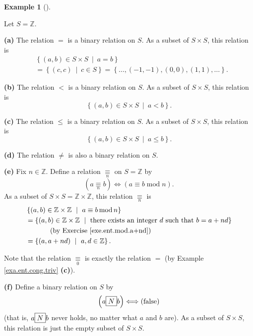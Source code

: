 \documentclass[numbers=enddot,12pt,final,onecolumn,notitlepage]{scrartcl}%
\numberwithin{exer}{subsection}
\theoremstyle{definition}
\newtheorem{exam}[theo]{Example}
\newenvironment{example}[1][]
{\begin{exam}[#1]\begin{leftbar}}
{\end{leftbar}\end{exam}}
\begin{document}
\begin{example}
\label{exa.eqrel.rel.rels1}Let $S=\mathbb{Z}$.

\textbf{(a)} The relation $=$ is a binary relation on $S$. As a subset of
$S\times S$, this relation is%
\begin{align*}
&  \left\{  \left(  a,b\right)  \in S\times S\ \mid\ a=b\right\}  \\
&  =\left\{  \left(  c,c\right)  \ \mid\ c\in S\right\}  =\left\{
\ldots,\left(  -1,-1\right)  ,\left(  0,0\right)  ,\left(  1,1\right)
,\ldots\right\}  .
\end{align*}


\textbf{(b)} The relation $<$ is a binary relation on $S$. As a subset of
$S\times S$, this relation is%
\[
\left\{  \left(  a,b\right)  \in S\times S\ \mid\ a<b\right\}  .
\]


\textbf{(c)} The relation $\leq$ is a binary relation on $S$. As a subset of
$S\times S$, this relation is%
\[
\left\{  \left(  a,b\right)  \in S\times S\ \mid\ a\leq b\right\}  .
\]


\textbf{(d)} The relation $\neq$ is also a binary relation on $S$.

\textbf{(e)} Fix $n\in\mathbb{Z}$. Define a relation $\underset{n}{\equiv}$ on
$S=\mathbb{Z}$ by
\[
\left(  a\underset{n}{\equiv}b\right)  \Longleftrightarrow\left(  a\equiv
b\operatorname{mod}n\right)  .
\]
As a subset of $S\times S=\mathbb{Z}\times\mathbb{Z}$, this relation
$\underset{n}{\equiv}$ is%
\begin{align*}
& \left\{  \left(  a,b\right)  \in\mathbb{Z}\times\mathbb{Z}\ \mid\ a\equiv
b\operatorname{mod}n\right\}  \\
& =\left\{  \left(  a,b\right)  \in\mathbb{Z}\times\mathbb{Z}\ \mid
\ \text{there exists an integer }d\text{ such that }b=a+nd\right\}  \\
& \ \ \ \ \ \ \ \ \ \ \left(  \text{by Exercise \ref{exe.ent.mod.a+nd}%
}\right)  \\
& =\left\{  \left(  a,a+nd\right)  \ \mid\ a,d\in\mathbb{Z}\right\}  .
\end{align*}


Note that the relation $\underset{0}{\equiv}$ is exactly the relation $=$ (by
Example \ref{exa.ent.cong.triv} \textbf{(c)}).

\textbf{(f)} Define a binary relation  on $S$ by%
\[
\left(  a\fbox{$N$}b\right)  \Longleftrightarrow\left(  \text{false}\right)
\]
(that is, $a\fbox{$N$}b$ never holds, no matter what $a$ and $b$ are). As a
subset of $S\times S$, this relation  is just the empty subset of
$S\times S$.


\end{example}
\end{document}
